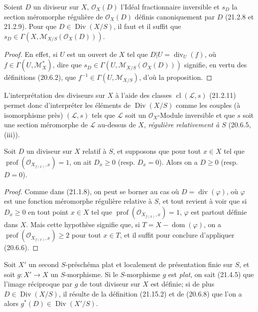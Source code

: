 \begin{proposition}[21.15.5]
\label{IV.21.15.5}
Soient $D$ un diviseur sur $X$, $\mathcal O_X(D)$ l'Idéal fractionnaire inversible et
$s_D$ la section méromorphe régulière de $\mathcal O_X(D)$ définis canoniquement par
$D$ (21.2.8 et 21.2.9). Pour que $D\in\operatorname{Div}(X/S)$, il faut et il suffit
que $s_D\in\Gamma(X,\mathscr M_{X/S}(\mathcal O_X(D)))$.
\end{proposition}

\begin{proof}
En effet, si $U$ est un ouvert de $X$ tel que $D|U=\operatorname{div}_U(f)$, où
$f\in\Gamma(U,\mathscr M_X^*)$, dire que
$s_D\in\Gamma(U,\mathscr M_{X/S}(\mathcal O_X(D)))$ signifie, en vertu des
définitions (20.6.2), que $f^{-1}\in\Gamma(U,\mathscr M_{X/S})$, d'où la
proposition.
\end{proof}

L'interprétation des diviseurs sur $X$ à l'aide des classes
$\operatorname{cl}(\mathscr L,s)$ (21.2.11) permet donc d'interpréter les éléments de
$\operatorname{Div}(X/S)$ comme les couples (à isomorphisme près) $(\mathscr L,s)$
tels que $\mathscr L$ soit un $\mathcal O_X$-Module inversible et que $s$ soit une
section méromorphe de $\mathscr L$ au-dessus de $X$, \emph{régulière relativement à
$S$} (20.6.5, (iii)).

\begin{proposition}[21.15.6]
\label{IV.21.15.6}
Soit $D$ un diviseur sur $X$ relatif à $S$, et supposons que pour tout $x\in X$ tel
que $\operatorname{prof}(\mathcal O_{X_{f(x)},x})=1$, on ait $D_x\geq0$
(resp. $D_x=0$). Alors on a $D\geq0$ (resp. $D=0$).
\end{proposition}

\begin{proof}
Comme dans (21.1.8), on peut se borner au cas où $D=\operatorname{div}(\varphi)$, où
$\varphi$ est une fonction méromorphe régulière relative à $S$, et tout revient à voir
que si $D_x\geq0$ en tout point $x\in X$ tel que
$\operatorname{prof}(\mathcal O_{X_{f(x)},x})=1$, $\varphi$ est partout définie dans
$X$. Mais cette hypothèse signifie que, si $T=X-\operatorname{dom}(\varphi)$, on a
$\operatorname{prof}(\mathcal O_{X_{f(x)},x})\geq2$ pour tout $x\in T$, et il suffit
pour conclure d'appliquer (20.6.6).
\end{proof}

\begin{env}[21.15.7]
\label{IV.21.15.7}
Soit $X'$ un second $S$-préschéma plat et localement de présentation finie sur $S$, et
soit $g:X'\to X$ un $S$-morphisme. Si le $S$-morphisme $g$ est \emph{plat}, on sait
(21.4.5) que l'image réciproque par $g$ de tout diviseur sur $X$ est définie; si de
plus $D\in\operatorname{Div}(X/S)$, il résulte de la définition (21.15.2) et de
(20.6.8) que l'on a alors $g^*(D)\in\operatorname{Div}(X'/S)$.
\end{env}

